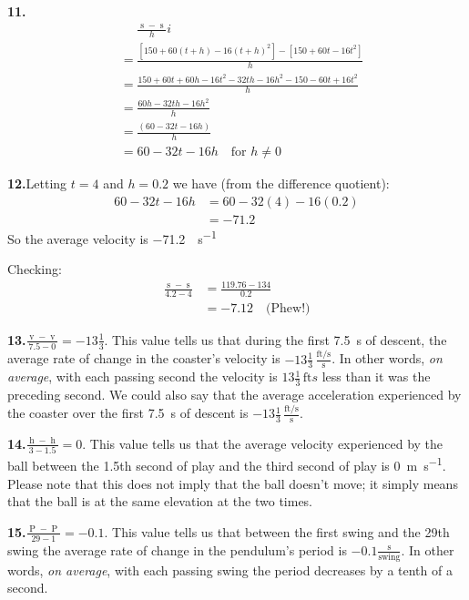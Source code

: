 \documentclass[12pt,]{book}
\theoremstyle{plain}
\theoremstyle{definition}
\numberwithin{equation}{section}
\newcommand{\fe}[2]{\mathop{{#1}{\left(#2\right)}}}
\begin{document}
\par\smallskip
\noindent\textbf{11.}\quad{}\begin{align*}
&\phantom{={}}\frac{\fe{s}{t+h}-\fe{s}{t}}{h}i\\
&=\frac{\left[150+60(t+h)-16(t+h)^2\right]-\left[150+60t-16t^2\right]}{h}\\
&=\frac{150+60t+60h-16t^2-32th-16h^2-150-60t+16t^2}{h}\\
&=\frac{60h-32th-16h^2}{h}\\
&=\frac{(60-32t-16h)}{h}\\
&=60-32t-16h\quad\text{for $h\neq0$}
\end{align*}%
\par\smallskip
\noindent\textbf{12.}\quad{}Letting \(t=4\) and \(h=0.2\) we have (from the difference quotient):\begin{align*}
60-32t-16h&=60-32(4)-16(0.2)\\
&=-71.2
\end{align*}So the average velocity is \SI{-71.2}{\foot\per\second}%
\par
Checking:\begin{align*}
\frac{\fe{s}{4.2}-\fe{s}{4}}{4.2-4}&=\frac{119.76-134}{0.2}\\
&=-7.12\quad\text{(Phew!)}
\end{align*}%
\par\smallskip
\noindent\textbf{13.}\quad{}\(\frac{\fe{v}{7.5}-\fe{v}{0}}{7.5-0}=-13\frac{1}{3}\). This value tells us that during the first \SI{7.5}{\second} of descent, the average rate of change in the coaster's velocity is \(-13\frac{1}{3}\,\frac{\text{ft/s}}{\text{s}}\).  In other words, \emph{on average}, with each passing second the velocity is \(13\frac{1}{3}\,\text{ft}{s}\) less than it was the preceding second.  We could also say that the average acceleration experienced by the coaster over the first \SI{7.5}{\second} of descent is \(-13\frac{1}{3}\,\frac{\text{ft/s}}{\text{s}}\).%
\par\smallskip
\noindent\textbf{14.}\quad{}\(\frac{\fe{h}{3}-\fe{h}{1.5}}{3-1.5}=0\). This value tells us that the average velocity experienced by the ball between the 1.5th second of play and the third second of play is \SI{0}{\meter\per\second}.  Please note that this does not imply that the ball doesn’t move; it simply means that the ball is at the same elevation at the two times.%
\par\smallskip
\noindent\textbf{15.}\quad{}\(\frac{\fe{P}{29}-\fe{P}{1}}{29-1}=-0.1\). This value tells us that between the first swing and the 29th swing the average rate of change in the pendulum's period is \(-0.1\frac{\text{s}}{\text{swing}}\).  In other words, \emph{on average}, with each passing swing the period decreases by a tenth of a second.%
\end{document}
